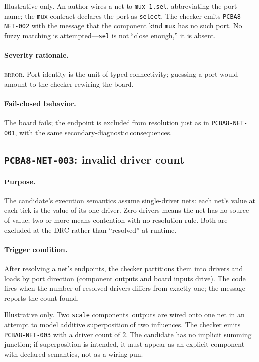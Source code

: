 \begin{example}\label{ch07:ex:net002}
Illustrative only. An author wires a net to \texttt{mux\_1.sel}, abbreviating the port name; the \texttt{mux} contract declares the port as \texttt{select}. The checker emits \texttt{PCBA8-NET-002} with the message that the component kind \texttt{mux} has no such port. No fuzzy matching is attempted---\texttt{sel} is not ``close enough,'' it is absent.
\end{example}

\paragraph{Severity rationale.} \textsc{error}. Port identity is the unit of typed connectivity; guessing a port would amount to the checker rewiring the board.

\paragraph{Fail-closed behavior.} The board fails; the endpoint is excluded from resolution just as in \texttt{PCBA8-NET-001}, with the same secondary-diagnostic consequences.

\subsection{\texttt{PCBA8-NET-003}: invalid driver count}\label{ch07:sub:net003}

\paragraph{Purpose.} The candidate's execution semantics assume single-driver nets: each net's value at each tick is the value of its one driver. Zero drivers means the net has no source of value; two or more means contention with no resolution rule. Both are excluded at the DRC rather than ``resolved'' at runtime.

\paragraph{Trigger condition.} After resolving a net's endpoints, the checker partitions them into drivers and loads by port direction (component outputs and board inputs drive). The code fires when the number of resolved drivers differs from exactly one; the message reports the count found.

\begin{example}\label{ch07:ex:net003}
Illustrative only. Two \texttt{scale} components' outputs are wired onto one net in an attempt to model additive superposition of two influences. The checker emits \texttt{PCBA8-NET-003} with a driver count of $2$. The candidate has no implicit summing junction; if superposition is intended, it must appear as an explicit component with declared semantics, not as a wiring pun.
\end{example}

